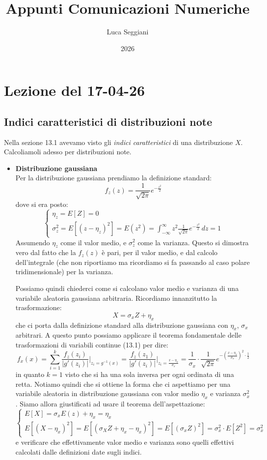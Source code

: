 \documentclass[a4paper,11pt]{article}
\title{Appunti Comunicazioni Numeriche}
\author{Luca Seggiani}
\date{2026}
\begin{document}
\section{Lezione del 17-04-26}

\thispagestyle{empty}
\pagestyle{fancy}

\subsection{Indici caratteristici di distribuzioni note}
Nella sezione 13.1 avevamo visto gli \textit{indici caratteristici} di una distribuzione $X$. Calcoliamoli adesso per distribuzioni note.

\begin{itemize}
\item \textbf{\textsf{Distribuzione gaussiana}} \\
Per la distribuzione gaussiana prendiamo la definizione standard:
$$
f_z(z) = \frac{1}{\sqrt{2 \pi}} e^{-\frac{z^2}{2}}
$$
dove si era posto:
$$
\begin{cases}
\eta_z = E[Z] = 0 \\
\sigma_z^2 = E[(z - \eta_z)^2] = E(z^2) = \int_{-\infty}^{\infty} z^2 \frac{1}{\sqrt{2 \pi}} e^{-\frac{z^2}{2}} \, dz = 1
\end{cases}
$$
Assumendo $\eta_z$ come il valor medio, e $\sigma_z^2$ come la varianza.
Questo si dimostra vero dal fatto che la $f_z(z)$ è pari, per il valor medio, e dal calcolo dell'integrale (che non riportiamo ma ricordiamo si fa passando al caso polare tridimensionale) per la varianza.

Possiamo quindi chiederci come si calcolano valor medio e varianza di una variabile aleatoria gaussiana arbitraria. Ricordiamo innanzitutto la trasformazione:
$$
X = \sigma_x Z + \eta_x
$$
che ci porta dalla definizione standard alla distribuzione gaussiana con $\eta_x$, $\sigma_x$ arbitrari. 
A questo punto possiamo applicare il teorema fondamentale delle trasformazioni di variabili continue (13.1) per dire:
$$
f_x(x) = \sum_{i = 1}^k \frac{f_z(z_i)}{|g'(z_i)|} \Bigg|_{z_i = g^{-1}(x)}
= \frac{f_z(z_1)}{|g'(z_i)|} \Bigg|_{z_i = \frac{x - \eta_x}{\sigma_x}}
= \frac{1}{\sigma_x} \cdot \frac{1}{\sqrt{2 \pi}} e^{-\left( \frac{x - \eta_x}{\sigma_x} \right)^2 \cdot \frac{1}{2}}
$$
in quanto $k = 1$ visto che si ha una sola inversa per ogni ordinata di una retta.
Notiamo quindi che si ottiene la forma che ci aspettiamo per una variabile aleatoria in distribuzione gaussiana con valor medio $\eta_x$ e varianza $\sigma_x^2$. Siamo allora giustificati ad usare il teorema dell'aspettazione:
$$
\begin{cases}
E[X] = \sigma_x E(z) + \eta_x = \eta_x \\
E[(X - \eta_x)^2] = E[(\sigma_X Z + \eta_x - \eta_x)^2] = E[(\sigma_x Z)^2] 
= \sigma_x^2 \cdot E[Z^2] = \sigma_x^2
\end{cases}
$$
e verificare che effettivamente valor medio e varianza sono quelli effettivi calcolati dalle definizioni date sugli indici.
\end{itemize}
\end{document}
